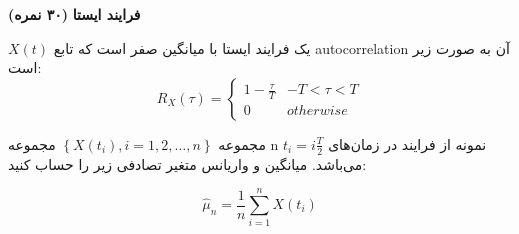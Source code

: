 \Large \textbf{فرایند ایستا}
\large \textbf{(۳۰ نمره)}

\normalsize \vspace{0.5cm}

$X\left( t \right)$
یک فرایند ایستا با میانگین صفر است که تابع autocorrelation آن به صورت زیر است:
$$
{R_X}\left( \tau  \right) = \left\{ {\begin{array}{*{20}{c}}
		{1 - \frac{\tau }{T}}&{ - T < \tau  < T}\\
		0&{otherwise}
\end{array}} \right.
$$

مجموعه
$\left\{ {X\left( {{t_i}} \right),i = 1,2, \ldots ,n} \right\}$
مجموعه n نمونه از فرایند در زمان‌های
${t_i} = i\frac{T}{2}$
می‌باشد. میانگین و واریانس متغیر تصادفی زیر را حساب کنید:

$$
{{\hat \mu }_n} = \frac{1}{n}\sum\limits_{i = 1}^n {X\left( {{t_i}} \right)}
$$